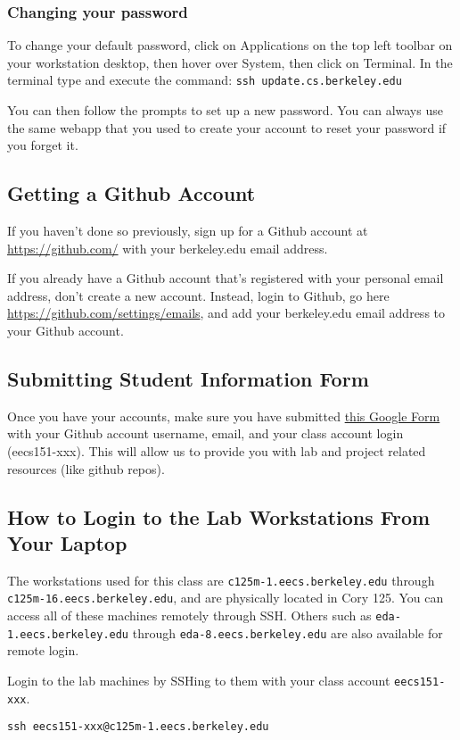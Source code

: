 \documentclass[11pt]{article}
\begin{document}
\subsubsection{Changing your password}
To change your default password, click on Applications on the top left toolbar on your workstation desktop, then hover over System, then click on Terminal. In the terminal type and execute the command: \verb|ssh update.cs.berkeley.edu|

You can then follow the prompts to set up a new password. You can always use the same webapp that you used to create your account to reset your password if you forget it.

\subsection{Getting a Github Account}
If you haven't done so previously, sign up for a Github account at \url{https://github.com/} with your berkeley.edu email address.

If you already have a Github account that's registered with your personal email address, don't create a new account. Instead, login to Github, go here \url{https://github.com/settings/emails}, and add your berkeley.edu email address to your Github account.

\subsection{Submitting Student Information Form}
Once you have your accounts, make sure you have submitted \href{https://docs.google.com/forms/d/e/1FAIpQLSd1DB8RXEDNyQ1s6KDuXZZ2MEkYeDAd7IpBQwGlX6athJm2-w/viewform?usp=sf_link}{this Google Form} with your Github account username, email, and your class account login (eecs151-xxx).  This will allow us to provide you with lab and project related resources (like github repos).

\subsection{How to Login to the Lab Workstations From Your Laptop}
The workstations used for this class are \texttt{c125m-1.eecs.berkeley.edu} through \texttt{c125m-16.eecs.berkeley.edu}, and are physically located in Cory 125.
You can access all of these machines remotely through SSH.
Others such as \texttt{eda-1.eecs.berkeley.edu} through \texttt{eda-8.eecs.berkeley.edu} are also available for remote login.

Login to the lab machines by SSHing to them with your class account \texttt{eecs151-xxx}.
\begin{verbatim}
ssh eecs151-xxx@c125m-1.eecs.berkeley.edu
\end{verbatim}
\end{document}
